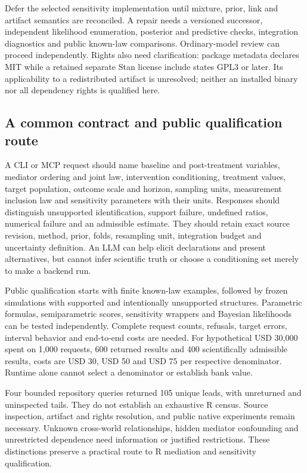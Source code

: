 Defer the selected sensitivity implementation until mixture, prior, link and
artifact semantics are reconciled. A repair needs a versioned successor,
independent likelihood enumeration, posterior and predictive checks,
integration diagnostics and public known-law comparisons. Ordinary-model
review can proceed independently. Rights also need clarification: package
metadata declares MIT while a retained separate Stan license include states
GPL3 or later. Its applicability to a redistributed artifact is unresolved;
neither an installed binary nor all dependency rights is qualified here.
\citep{exec25_rmed_bayesgmed,exec25_rmed_choice}

\subsection{A common contract and public qualification route}

A CLI or MCP request should name baseline and post-treatment variables,
mediator ordering and joint law, intervention conditioning, treatment values,
target population, outcome scale and horizon, sampling units, measurement
inclusion law and sensitivity parameters with their units. Responses should
distinguish unsupported identification, support failure, undefined ratios,
numerical failure and an admissible estimate. They should retain exact source
revision, method, prior, folds, resampling unit, integration budget and
uncertainty definition. An LLM can help elicit declarations and present
alternatives, but cannot infer scientific truth or choose a conditioning set
merely to make a backend run. \citep{exec25_rmed_choice}

Public qualification starts with finite known-law examples, followed by frozen
simulations with supported and intentionally unsupported structures. Parametric
formulas, semiparametric scores, sensitivity wrappers and Bayesian likelihoods
can be tested independently. Complete request counts, refusals, target errors,
interval behavior and end-to-end costs are needed. For hypothetical USD 30,000
spent on 1,000 requests, 600 returned results and 400 scientifically admissible
results, costs are USD 30, USD 50 and USD 75 per respective denominator. Runtime
alone cannot select a denominator or establish bank value. \citep{exec25_rmed_choice}

Four bounded repository queries returned 105 unique leads, with unreturned
and uninspected tails. They do not establish an exhaustive R census. Source
inspection, artifact and rights resolution, and public native experiments
remain necessary. Unknown cross-world relationships, hidden mediator
confounding and unrestricted dependence need information or justified
restrictions. These distinctions preserve a practical route to R mediation
and sensitivity qualification. \citep{exec25_rmed_choice}

